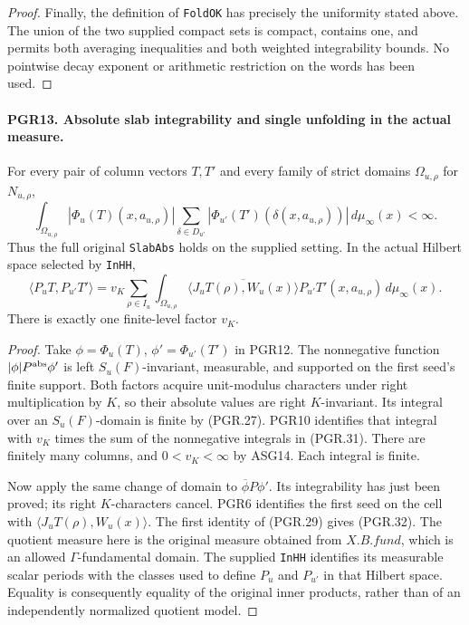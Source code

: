 \begin{proof}
Finally, the definition of \texttt{FoldOK} has precisely the
uniformity stated above.  The union of the two supplied compact sets
is compact, contains one, and permits both averaging inequalities and
both weighted integrability bounds.  No pointwise decay exponent or
arithmetic restriction on the words has been used.
\end{proof}

\paragraph{PGR13. Absolute slab integrability and single unfolding in the actual measure.}
\label{claim:PGR13}
For every pair of column vectors \(T,T'\) and every family of
strict domains \(\Omega_{u,\rho}\) for \(N_{u,\rho}\),
\[
 \int_{\Omega_{u,\rho}}|\Phi_u(T)(x,a_{u,\rho})|
       \sum_{\delta\in D_{u'}}
          |\Phi_{u'}(T')(\delta(x,a_{u,\rho}))|
                     \,d\mu_\infty(x)<\infty.
\tag{PGR.31}
\]
Thus the full original \texttt{SlabAbs} holds on the supplied
setting.  In the actual Hilbert space selected by \texttt{InHH},
\[
 \langle P_uT,P_{u'}T'\rangle
   =v_K\sum_{\rho\in I_u}\int_{\Omega_{u,\rho}}
       \overline{\langle J_uT(\rho),W_u(x)\rangle}
          P_{u'}T'(x,a_{u,\rho})\,d\mu_\infty(x).
\tag{PGR.32}
\]
There is exactly one finite-level factor \(v_K\).
\begin{proof}
Take \(\phi=\Phi_u(T)\), \(\phi'=\Phi_{u'}(T')\)
in PGR12.  The nonnegative function
\(|\phi|P^{\rm abs}\phi'\) is left \(S_u(F)\)-invariant,
measurable, and supported on the first seed's finite support.  Both
factors acquire unit-modulus characters under right multiplication by
\(K\), so their absolute values are right \(K\)-invariant.
Its integral over an \(S_u(F)\)-domain is finite by (PGR.27).
PGR10 identifies that integral with \(v_K\) times the sum of
the nonnegative integrals in (PGR.31).  There are finitely many columns,
and \(0<v_K<\infty\) by ASG14.  Each integral is finite.

Now apply the same change of domain to
\(\overline{\phi}P\phi'\).  Its integrability has just been
proved; its right \(K\)-characters cancel.  PGR6 identifies the
first seed on the cell with
\(\langle J_uT(\rho),W_u(x)\rangle\).
The first identity of (PGR.29) gives (PGR.32).  The quotient measure
here is the original measure obtained from \(X.B.fund\), which is
an allowed \(\Gamma\)-fundamental domain.  The supplied
\texttt{InHH} identifies its measurable scalar periods with the
classes used to define \(P_u\) and \(P_{u'}\) in that Hilbert
space.  Equality is consequently equality of the original inner
products, rather than of an independently normalized quotient model.
\end{proof}


